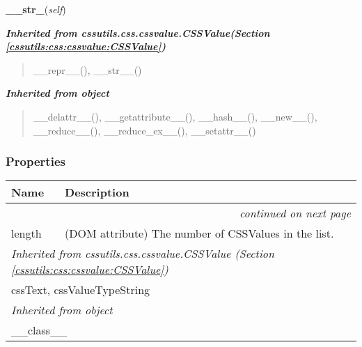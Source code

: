     \vspace{0.5ex}

\hspace{.8\funcindent}\begin{boxedminipage}{\funcwidth}

    \raggedright \textbf{\_\_str\_}(\textit{self})

\setlength{\parskip}{2ex}
\setlength{\parskip}{1ex}
    \end{boxedminipage}


\large{\textbf{\textit{Inherited from cssutils.css.cssvalue.CSSValue\textit{(Section \ref{cssutils:css:cssvalue:CSSValue})}}}}

\begin{quote}
\_\_repr\_\_(), \_\_str\_\_()
\end{quote}

\large{\textbf{\textit{Inherited from object}}}

\begin{quote}
\_\_delattr\_\_(), \_\_getattribute\_\_(), \_\_hash\_\_(), \_\_new\_\_(), \_\_reduce\_\_(), \_\_reduce\_ex\_\_(), \_\_setattr\_\_()
\end{quote}


  \subsubsection{Properties}

    \vspace{-1cm}
\hspace{\varindent}\begin{longtable}{|p{\varnamewidth}|p{\vardescrwidth}|l}
\cline{1-2}
\cline{1-2} \centering \textbf{Name} & \centering \textbf{Description}& \\
\cline{1-2}
\endhead\cline{1-2}\multicolumn{3}{r}{\small\textit{continued on next page}}\\\endfoot\cline{1-2}
\endlastfoot\raggedright l\-e\-n\-g\-t\-h\- & \raggedright (DOM attribute) The number of CSSValues in the list.&\\
\cline{1-2}
\multicolumn{2}{|l|}{\textit{Inherited from cssutils.css.cssvalue.CSSValue \textit{(Section \ref{cssutils:css:cssvalue:CSSValue})}}}\\
\multicolumn{2}{|p{\varwidth}|}{\raggedright cssText, cssValueTypeString}\\
\cline{1-2}
\multicolumn{2}{|l|}{\textit{Inherited from object}}\\
\multicolumn{2}{|p{\varwidth}|}{\raggedright \_\_class\_\_}\\
\cline{1-2}
\end{longtable}


